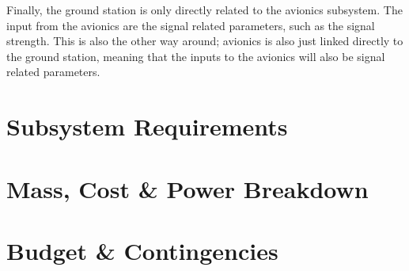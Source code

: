 Finally, the ground station is only directly related to the avionics subsystem. The input from the avionics are the signal related parameters, such as the signal strength. This is also the other way around; avionics is also just linked directly to the ground station, meaning that the inputs to the avionics will also be signal related parameters.






\newpage


\label{N2}

\section{Subsystem Requirements}
\label{sec:subs_requ}

\section{Mass, Cost \& Power Breakdown}
\label{sec:mass_cost_powe_brea}

\section{Budget \& Contingencies}
\label{sec:cont}

